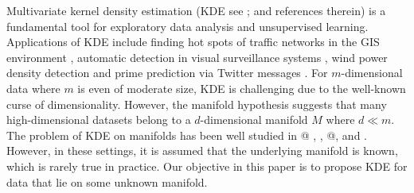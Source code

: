 \documentclass[11pt,a4paper,]{article}
\begin{document}
Multivariate kernel density estimation (KDE see \textcite{Parzen1962-gt}; \textcite{Chen2017-dw} and references therein) is a fundamental tool for exploratory data analysis and unsupervised learning. Applications of KDE include finding hot spots of traffic networks in the GIS environment \autocite{Xie2008-eb,Okabe2009-nb}, automatic detection in visual surveillance systems \autocite{Elgammal2002-cw}, wind power density detection \autocite{Jeon2012-ac} and prime prediction via Twitter messages \autocite{Gerber2014-tq}. For \(m\)-dimensional data where \(m\) is even of moderate size, KDE is challenging due to the well-known curse of dimensionality. However, the manifold hypothesis suggests that many high-dimensional datasets belong to a \(d\)-dimensional manifold \(M\) where \(d\ll m\). The problem of KDE on manifolds has been well studied in @ \textcite{Hendriks1990-bt}, \textcite{Izenman1991-cj}, @\textcite{Pelletier2005-vu}, \textcite{Henry2013-da} and \textcite{Berenfeld2022-fd}. However, in these settings, it is assumed that the underlying manifold is known, which is rarely true in practice. Our objective in this paper is to propose KDE for data that lie on some unknown manifold.
\end{document}
